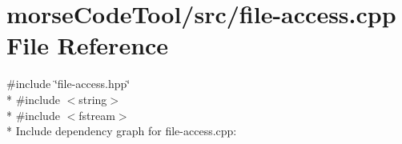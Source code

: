 \hypertarget{file-access_8cpp}{}\section{morse\+Code\+Tool/src/file-\/access.cpp File Reference}
\label{file-access_8cpp}
{\ttfamily \#include \char`\"{}file-\/access.\+hpp\char`\"{}}\\*
{\ttfamily \#include $<$string$>$}\\*
{\ttfamily \#include $<$fstream$>$}\\*
Include dependency graph for file-\/access.cpp\+:
